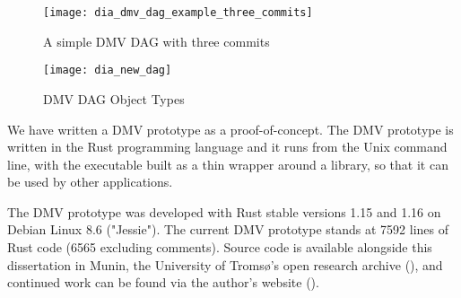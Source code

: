 \begin{figure}[]
    \centering

    \begin{minipage}{.65\textwidth}
        \texttt{[image: dia\_dmv\_dag\_example\_three\_commits]}
        \caption{A simple DMV DAG with three commits}
        \label{dia_dmv_dag_example_three_commits}
    \end{minipage}%
    \begin{minipage}{.35\textwidth}
        \texttt{[image: dia\_new\_dag]}
        \caption{DMV DAG Object Types}
        \label{fig:dia_new_dag}
    \end{minipage}
\end{figure}


We have written a \gls{DMV} prototype as a proof-of-concept. The \gls{DMV}
prototype is written in the Rust programming language and it runs from the Unix
command line, with the executable built as a thin wrapper around a library, so
that it can be used by other applications.

The \gls{DMV} prototype was developed with Rust stable versions 1.15 and 1.16 on
Debian Linux 8.6 ("Jessie"). The current DMV prototype stands at \num{7592}
lines of Rust code (\num{6565} excluding comments). Source code is available
alongside this dissertation in Munin, the University of Tromsø's open research
archive (\muninurl), and continued work can be found via the author's website
(\dmvurl).
